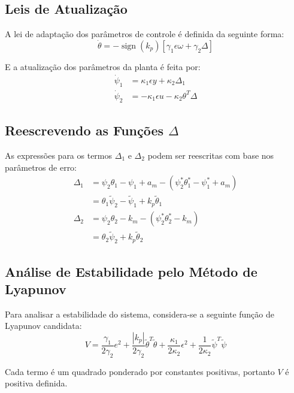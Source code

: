 \documentclass[10pt]{article}
\begin{document}
\subsection{Leis de Atualização}

A lei de adaptação dos parâmetros de controle é definida da seguinte forma:
\begin{equation}
    \dot{\theta} = -\operatorname{sign}(k_p)[\gamma_1 e \omega + \gamma_2 \Delta]
\end{equation}

E a atualização dos parâmetros da planta é feita por:
\begin{align}
    \dot{\psi}_1 &= \kappa_1 \epsilon y + \kappa_2 \Delta_1 \\
    \dot{\psi}_2 &= -\kappa_1 \epsilon u - \kappa_2 \theta^T \Delta
\end{align}

\subsection{Reescrevendo as Funções $\Delta$}

As expressões para os termos $\Delta_1$ e $\Delta_2$ podem ser reescritas com base nos parâmetros de erro:
\begin{align}
    \Delta_1 &= \psi_2 \theta_1 - \psi_1 + a_m - (\psi_2^* \theta_1^* - \psi_1^* + a_m) \\
             &= \theta_1 \tilde{\psi}_2 - \tilde{\psi}_1 + k_p \tilde{\theta}_1 \\
    \Delta_2 &= \psi_2 \theta_2 - k_m - (\psi_2^* \theta_2^* - k_m) \\
             &= \theta_2 \tilde{\psi}_2 + k_p \tilde{\theta}_2
\end{align}

\subsection{Análise de Estabilidade pelo Método de Lyapunov}

Para analisar a estabilidade do sistema, considera-se a seguinte função de Lyapunov candidata:
\begin{equation}
V = \frac{\gamma_1}{2\gamma_2} e^2 + \frac{|k_p|}{2\gamma_2} \tilde{\theta}^T \tilde{\theta} + \frac{\kappa_1}{2\kappa_2} \epsilon^2 + \frac{1}{2\kappa_2} \tilde{\psi}^T \tilde{\psi}
\end{equation}

Cada termo é um quadrado ponderado por constantes positivas, portanto $V$ é positiva definida.
\end{document}
